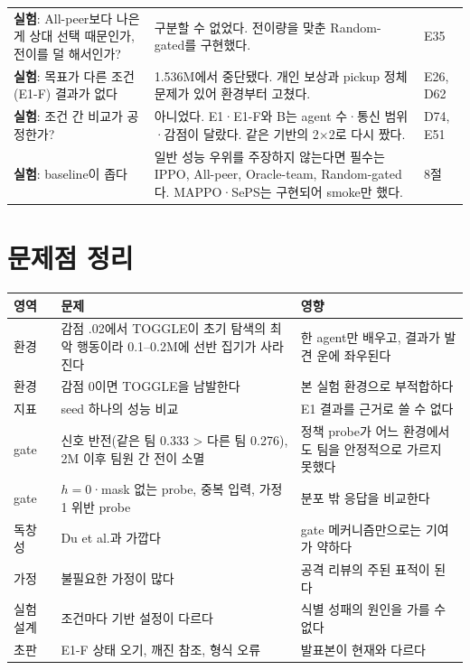 \documentclass[11pt]{article}
\begin{document}
\begin{xltabular}{\textwidth}{>{\raggedright\arraybackslash}p{4.2cm} L >{\raggedright\arraybackslash}p{2.6cm}}
\textbf{실험}: All-peer보다 나은 게 상대 선택 때문인가, 전이를 덜 해서인가? & 구분할 수 없었다. 전이량을 맞춘 Random-gated를 구현했다. & E35 \\
\textbf{실험}: 목표가 다른 조건(E1-F) 결과가 없다 & 1.536M에서 중단됐다. 개인 보상과 pickup 정체 문제가 있어 환경부터 고쳤다. & E26, D62 \\
\textbf{실험}: 조건 간 비교가 공정한가? & 아니었다. E1·E1-F와 B는 agent 수·통신 범위·감점이 달랐다. 같은 기반의 2$\times$2로 다시 짰다. & D74, E51 \\
\textbf{실험}: baseline이 좁다 & 일반 성능 우위를 주장하지 않는다면 필수는 IPPO, All-peer, Oracle-team, Random-gated다. MAPPO·SePS는 구현되어 smoke만 했다. & 8절 \\
\bottomrule
\end{xltabular}

\section{문제점 정리}

\begin{xltabular}{\textwidth}{>{\raggedright\arraybackslash}p{2.2cm} L L}
\toprule
영역 & 문제 & 영향 \\
\midrule
\endhead
환경 & 감점 .02에서 TOGGLE이 초기 탐색의 최악 행동이라 0.1--0.2M에 선반 집기가 사라진다 & 한 agent만 배우고, 결과가 발견 운에 좌우된다 \\
환경 & 감점 0이면 TOGGLE을 남발한다 & 본 실험 환경으로 부적합하다 \\
지표 & seed 하나의 성능 비교 & E1 결과를 근거로 쓸 수 없다 \\
gate & 신호 반전(같은 팀 0.333 > 다른 팀 0.276), 2M 이후 팀원 간 전이 소멸 & 정책 probe가 어느 환경에서도 팀을 안정적으로 가르지 못했다 \\
gate & $h{=}0$·mask 없는 probe, 중복 입력, 가정 1 위반 probe & 분포 밖 응답을 비교한다 \\
독창성 & Du et al.과 가깝다 & gate 메커니즘만으로는 기여가 약하다 \\
가정 & 불필요한 가정이 많다 & 공격 리뷰의 주된 표적이 된다 \\
실험 설계 & 조건마다 기반 설정이 다르다 & 식별 성패의 원인을 가를 수 없다 \\
초판 & E1-F 상태 오기, 깨진 참조, 형식 오류 & 발표본이 현재와 다르다 \\
\bottomrule
\end{xltabular}
\end{document}
